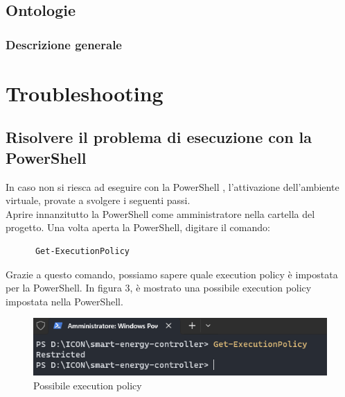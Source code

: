 \documentclass[12pt, letterpaper]{article}
\begin{document}
\subsection{Ontologie}

\subsubsection{Descrizione generale}



\section{Troubleshooting}

\subsection{Risolvere il problema di esecuzione con la PowerShell}
\label{sec:powershell-error}

In caso non si riesca ad eseguire con la PowerShell \cite{power-shell-resolution},
l'attivazione dell'ambiente virtuale, provate a svolgere i seguenti passi. \\

\noindent Aprire innanzitutto la PowerShell come amministratore nella cartella del progetto.
Una volta aperta la PowerShell, digitare il comando:

\begin{verbatim}
      Get-ExecutionPolicy
\end{verbatim}

\noindent Grazie a questo comando, possiamo sapere quale execution policy è impostata per la PowerShell.
In figura 3, è mostrato una possibile execution policy impostata nella PowerShell. \\

\begin{figure}[h]
      \centering
      \includegraphics{powershell-error.png}
      \caption{Possibile execution policy}
\end{figure}
\end{document}
